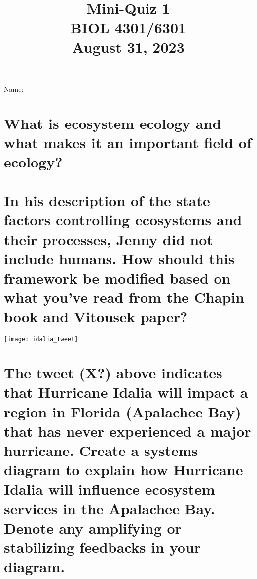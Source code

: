 \documentclass[12pt, notitlepage]{article}   	%
\title{
	\textbf{
		Mini-Quiz 1
	} \\
	\large BIOL 4301/6301 \\
	\large August 31, 2023 \\
}
\date{\vspace{-5ex}}
\def\wl{\par \vspace{\baselineskip}}
\begin{document}
{\selectfont %

\large{Name:}

{\let\newpage\relax\maketitle}



\section{\small{What is ecosystem ecology and what makes it an important field of ecology?}}

\wl
\wl
\wl
\wl
\wl
\wl
\wl

\section{\small{In his description of the state factors controlling ecosystems and their processes,
Jenny did not include humans. How should this framework be modified based on what you've read from the Chapin book
and Vitousek paper?}}

\newpage

\texttt{[image: idalia\_tweet]}

\section{\small{The tweet (X?) above indicates that Hurricane Idalia
will impact a region in Florida (Apalachee Bay) that has never experienced a major hurricane.
Create a systems diagram to explain how Hurricane Idalia
will influence ecosystem services in the Apalachee Bay. Denote any amplifying or
stabilizing feedbacks in your diagram.}}

} %
\end{document}
